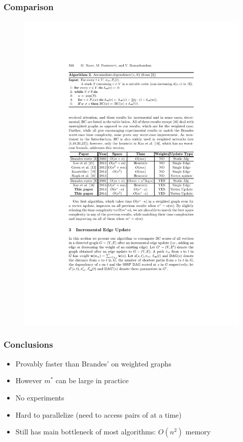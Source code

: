 \begin{frame}
  \frametitle{Comparison}

  \begin{figure}[H]
    \centering
    \includegraphics[width=\textwidth]{imgs/npr14-comparison}
  \end{figure}
\end{frame}


\begin{frame}
  \frametitle{Conclusions}

  \begin{itemize}
    \item Provably faster than Brandes' on weighted graphs
    \item However $m^*$ can be large in practice
    \item No experiments
    \item Hard to parallelize (need to access pairs of \spdag at a time)
    \item Still has main bottleneck of most algorithms: $O(n^2)$ memory
  \end{itemize}
\end{frame}
